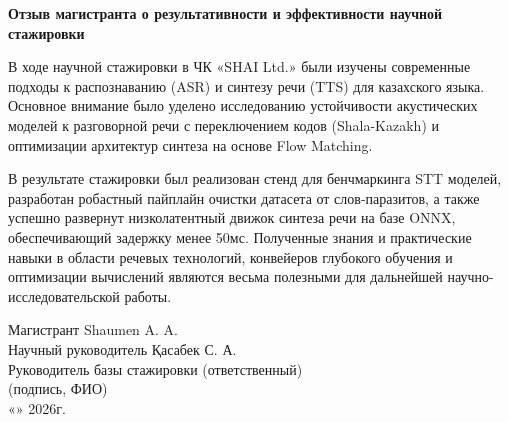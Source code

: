 \documentclass[12pt,a4paper]{article}
\begin{document}
\vspace{1cm}
\noindent \textbf{\large Отзыв магистранта о результативности и эффективности научной стажировки}

\vspace{3mm}
В ходе научной стажировки в ЧК «SHAI Ltd.» были изучены современные подходы к распознаванию (ASR) и синтезу речи (TTS) для казахского языка. Основное внимание было уделено исследованию устойчивости акустических моделей к разговорной речи с переключением кодов (Shala-Kazakh) и оптимизации архитектур синтеза на основе Flow Matching.

В результате стажировки был реализован стенд для бенчмаркинга STT моделей, разработан робастный пайплайн очистки датасета от слов-паразитов, а также успешно развернут низколатентный движок синтеза речи на базе ONNX, обеспечивающий задержку менее 50мс. Полученные знания и практические навыки в области речевых технологий, конвейеров глубокого обучения и оптимизации вычислений являются весьма полезными для дальнейшей научно-исследовательской работы.

\vspace{1.5cm}
\noindent Магистрант \underline{\hspace{5cm}} Shaumen A. A.\\[8mm]
Научный руководитель \underline{\hspace{5cm}} Қасабек С. А.\\[8mm]
Руководитель базы стажировки (ответственный)\\[2mm]
\underline{\hspace{5cm}} {\footnotesize (подпись, ФИО)}\\[8mm]
«\underline{\hspace{1cm}}» \underline{\hspace{3cm}} 2026г.
\end{document}
